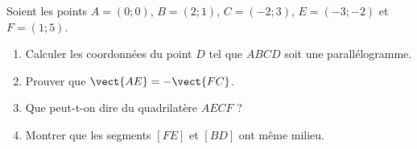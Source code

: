 
\begin{exercice}\label{exosmath-0064}

    Soient les points \( A=(0;0)\), \( B=(2;1)\), \( C=(-2;3)\), \( E=(-3;-2)\) et \( F=(1;5)\).
    \begin{enumerate}
        \item
            Calculer les coordonnées du point \( D\) tel que \( ABCD\) soit une parallélogramme.
        \item
            Prouver que \( \vect{ AE }=-\vect{ FC }\).
        \item
            Que peut-t-on dire du quadrilatère \( AECF\) ?
        \item
            Montrer que les segments \( [FE]\) et \( [BD]\) ont même milieu.
    \end{enumerate}

\end{exercice}

